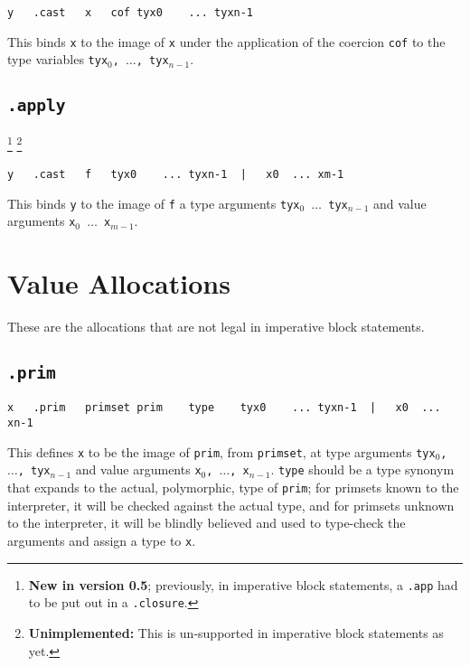 \documentclass{report}
\newcommand\stringcode[1]{\texttt{#1}}
\newcommand\unimpl[1]{\footnote{\textbf{Unimplemented: }#1}}
\newcommand\new[2]{\footnote{\textbf{New in version #1}; previously, #2}}
\begin{document}
\begin{verbatim}
y	.cast	x	cof	tyx0	...	tyxn-1
\end{verbatim}

This binds \stringcode{x} to the image of \stringcode{x} under the application of the coercion \stringcode{cof} to the type variables \stringcode{tyx$_0$, $\ldots$, tyx$_{n-1}$}.

\subsection{\stringcode{.apply}}
\new{0.5}{in imperative block statements, a \stringcode{.app} had to be put out in a \stringcode{.closure}.}
\unimpl{This is un-supported in imperative block statements as yet.}

\begin{verbatim}
y	.cast	f	tyx0	...	tyxn-1	|	x0	...	xm-1
\end{verbatim}

This binds \stringcode{y} to the image of \stringcode{f} a type arguments \stringcode{tyx$_0$ $\ldots$ tyx$_{n-1}$} and value arguments \stringcode{x$_0$ $\ldots$ x$_{m-1}$}.

\section{Value Allocations}
\label{value_alloc}

These are the allocations that are not legal in imperative block statements.

\subsection{\stringcode{.prim}}

\begin{verbatim}
x	.prim	primset	prim	type	tyx0	...	tyxn-1	|	x0	...	xn-1
\end{verbatim}

This defines \stringcode{x} to be the image of \stringcode{prim}, from \stringcode{primset},
at type arguments \stringcode{tyx$_0$, $\ldots$, tyx$_{n-1}$}
and value arguments \stringcode{x$_0$, $\ldots$, x$_{n-1}$}.
\stringcode{type} should be a type synonym that expands to the actual, polymorphic, type of \stringcode{prim};
for primsets known to the interpreter, it will be checked against the actual type,
and for primsets unknown to the interpreter,
it will be blindly believed and used to type-check the arguments and assign a type to \stringcode{x}.
\end{document}
